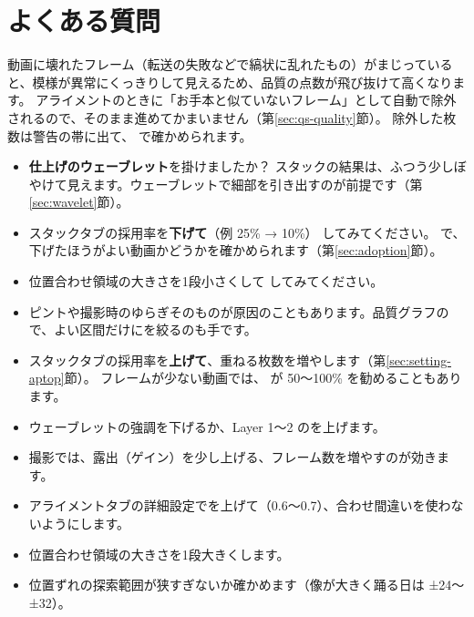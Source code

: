 \section{よくある質問}

動画に壊れたフレーム（転送の失敗などで縞状に乱れたもの）がまじっていると、模様が異常にくっきりして見えるため、品質の点数が飛び抜けて高くなります。
アライメントのときに「お手本と似ていないフレーム」として自動で除外されるので、そのまま進めてかまいません（第\ref{sec:qs-quality}節）。
除外した枚数は警告の帯に出て、 で確かめられます。

\begin{itemize}[itemsep=1pt]
  \item \textbf{仕上げのウェーブレット}を掛けましたか？ スタックの結果は、ふつう少しぼやけて見えます。ウェーブレットで細部を引き出すのが前提です（第\ref{sec:wavelet}節）。
  \item スタックタブの採用率を\textbf{下げて}（例 25\% → 10\%） してみてください。
         で、下げたほうがよい動画かどうかを確かめられます（第\ref{sec:adoption}節）。
  \item 位置合わせ領域の大きさを1段小さくして  してみてください。
  \item ピントや撮影時のゆらぎそのものが原因のこともあります。品質グラフので、よい区間だけにを絞るのも手です。
\end{itemize}

\begin{itemize}[itemsep=1pt]
  \item スタックタブの採用率を\textbf{上げて}、重ねる枚数を増やします（第\ref{sec:setting-aptop}節）。
        フレームが少ない動画では、 が 50〜100\% を勧めることもあります。
  \item ウェーブレットの強調を下げるか、Layer 1〜2 のを上げます。
  \item 撮影では、露出（ゲイン）を少し上げる、フレーム数を増やすのが効きます。
\end{itemize}

\begin{itemize}[itemsep=1pt]
  \item アライメントタブの詳細設定でを上げて（0.6〜0.7）、合わせ間違いを使わないようにします。
  \item 位置合わせ領域の大きさを1段大きくします。
  \item 位置ずれの探索範囲が狭すぎないか確かめます（像が大きく踊る日は ±24〜±32）。
\end{itemize}

